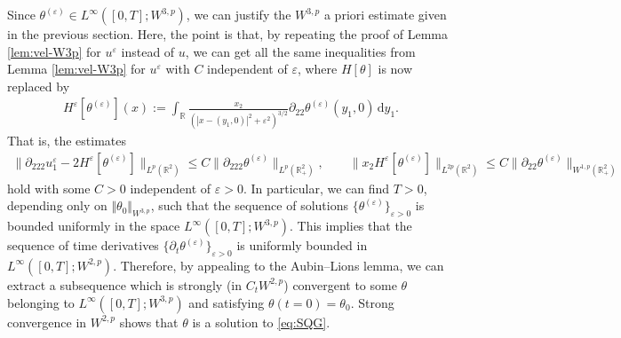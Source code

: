 \documentclass[10pt]{amsart}
\theoremstyle{definition}
\theoremstyle{remark}
\numberwithin{equation}{section}
\newcommand{\nrm}[1]{\Vert#1\Vert}
\newcommand{\ud}{\mathrm{d}}
\newcommand{\rd}{\partial}
\newcommand{\0}{\emptyset}
\newcommand{\tht}{\theta}
\newcommand{\bbR}{\mathbb R}
\newcommand{\varep}{\varepsilon}
\begin{document}
        Since $\tht^{(\varep)} \in   L^{\infty}([0,T];W^{3,p})$, we can justify the $W^{3,p}$ a priori estimate given in the previous section. Here, the point is that, by repeating the proof of Lemma \ref{lem:vel-W3p} for $u^\varep$ instead of $u$, we can get all the same inequalities from Lemma \ref{lem:vel-W3p} for $u^\varep$ with $C$ independent of $\varep$, where $H[\tht]$ is now replaced by 
        \begin{equation*}
        	\begin{split}
        		H^{\varep}[\tht^{(\varep)}](x) := \int_{\bbR} \frac{x_2}{(|x-(y_1,0)|^2 + \varep^2 )^{3/2}} \partial_{22} \tht^{(\varep)} (y_1,0) \,\ud y_1.
        	\end{split}
        \end{equation*}
        That is, the estimates \begin{equation*} 
        	\begin{split}
        		\| \rd_{222}u_1^{\varep} - 2H^{\varep}[\tht^{(\varep)} ] \|_{L^{p}(\bbR^{2})} \leq C\| \rd_{222} \tht^{(\varep)}  \|_{L^p(\bbR^2_{+})}, \qquad 	\| x_2 H^{\varep}[\tht^{(\varep)} ] \|_{L^{2p}(\bbR^2)}  \leq C \| \partial_{22} \tht^{(\varep)}  \|_{W^{1,p}(\bbR^2_{+})}
        	\end{split}
        \end{equation*}   hold with some $C>0$ independent of $\varep>0$. In particular, we can find $T>0$, depending only on $\nrm{\tht_{0}}_{W^{3,p}}$, such that the sequence of solutions $\{ \tht^{(\varep)} \}_{\varep>0}$ is bounded uniformly in the space $L^{\infty}([0,T];W^{3,p})$. This implies that the sequence of time derivatives $\{ \rd_t\tht^{(\varep)} \}_{\varep>0}$ is uniformly bounded in $L^{\infty}([0,T];W^{2,p})$. Therefore, by appealing to the Aubin--Lions lemma, we can extract a subsequence which is strongly (in $C_{t}W^{2,p}$) convergent to some $\tht$ belonging to $L^{\infty}([0,T];W^{3,p})$ and satisfying $\tht(t=0)=\tht_{0}$. Strong convergence in $W^{2,p}$ shows that $\tht$ is a solution to \eqref{eq:SQG}. 
        
\end{document}

